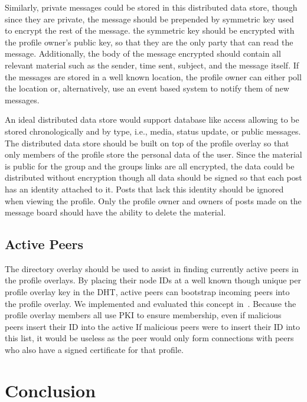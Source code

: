 \documentclass[letterpaper,twocolumn,10pt]{article}
\begin{document}
Similarly, private messages could be stored in this distributed data store,
though since they are private, the message should be prepended by symmetric
key used to encrypt the rest of the message.  the symmetric key should be
encrypted with the profile owner's public key, so that they are the only party
that can read the message.  Additionally, the body of the message encrypted
should contain all relevant material such as the sender, time sent, subject,
and the message itself.  If the messages are stored in a well known location,
the profile owner can either poll the location or, alternatively, use an event
based system to notify them of new messages.

An ideal distributed data store would support database like access allowing
to be stored chronologically and by type, i.e., media, status update, or public
messages.  The distributed data store should be built on top of the profile
overlay so that only members of the profile store the personal
data of the user.  Since the material is public for the group and the groups
links are all encrypted, the data could be distributed without encryption
though all data should be signed so that each post has an identity attached to
it.  Posts that lack this identity should be ignored when viewing the profile.
Only the profile owner and owners of posts made on the message board should
have the ability to delete the material.

\subsection{Active Peers}
The directory overlay should be used to assist in finding currently active peers
in the profile overlays.  By placing their node IDs at a well known though unique
per profile overlay key in the DHT, active peers can bootstrap incoming peers
into the profile overlay.  We implemented and evaluated this concept
in~\cite{icdcs10}.  Because the profile overlay members all use PKI to ensure
membership, even if malicious peers insert their ID into the active If malicious
peers were to insert their ID into this list, it would be useless as the peer
would only form connections with peers who also have a signed certificate for
that profile.

\section{Conclusion}
\label{conclusion}


\small{

\suppressfloats
}
\end{document}
